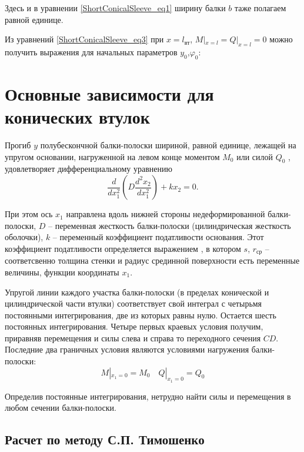 Здесь и в уравнении \eqref{ShortConicalSleeve_eq1} ширину балки $b$  таже полагаем равной единице.

Из уравнений \eqref{ShortConicalSleeve_eq3} при $x=l_{\text{вт}}$, $M|_{x=l}=Q|_{x=l}=0$ можно получить выражения для начальных параметров $y_0$,${\varphi}_0$:





\section{Основные зависимости для конических втулок}
\label{ConicalSleeve}

Прогиб $y$ полубескончной балки-полоски шириной, равной единице, лежащей на упругом основании, нагруженной на левом конце моментом $M_0$ или силой $Q_0$ , удовлетворяет дифференциальному уравнению 
\begin{equation}
  \label{ConicalSleeve_eq1}
  \frac{d}{dx_1^2} \left( D \frac{d^2 x_2}{dx_1^2} \right)+kx_2=0.  
\end{equation}

При этом ось $x_1$ направлена вдоль нижней стороны недеформированной балки-полоски, $D$ -- переменная жесткость балки-полоски (цилиндрическая жесткость оболочки), $k$ -- переменный коэффициент податливости основания.
Этот коэффициент податливости определяется выражением , в котором $s$, $r_{\text{ср}}$ -- соответсвенно толщина стенки и радиус срединной поверхности есть переменные величины, функции координаты $x_1$.

Упругой линии каждого участка балки-полоски (в пределах конической и цилиндрической части втулки) соответствует свой интеграл с четырьмя постоянными интегрирования, две из которых равны нулю.
Остается шесть постоянных интегрирования.
Четыре первых краевых условия получим, приравняв перемещения и силы слева и справа то переходного сечения $CD$.
Последние два граничных условия являются условиями нагружения балки-полоски:
\begin{equation}
  \label{ConicalSleeve_eq2}
    M|_{x_1=0}=M_0 \quad Q|_{x_1=0}=Q_0 
\end{equation}

Определив постоянные интегрирования, нетрудно найти силы и перемещения в любом сечении балки-полоски.

\subsection{Расчет по методу С.П. Тимошенко}
\label{Timoshenko}

